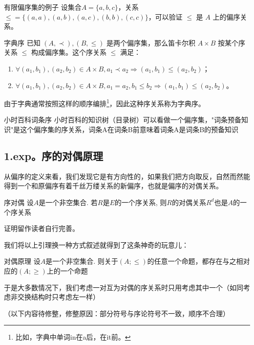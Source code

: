 \begin{example}{有限偏序集的例子}
设集合$A = \{a,b,c\}$，关系$\leq\!= \{(a,a),(a,b),(a,c),(b,b),(c,c)\}$，可以验证 $\leq$ 是 $A$ 上的偏序关系。
\end{example}

\begin{example}{字典序}\label{ex_OrdRel_1}
已知 $(A,\prec),(B,\leq)$ 是两个偏序集，那么笛卡尔积 $A\times B$ 按某个序关系 $\leqslant$ 构成偏序集。这个序关系 $\leqslant$ 满足：
\begin{enumerate}
\item $\forall(a_1,b_1),(a_2,b_2) \in A\times B, a_1\prec a_2 \Rightarrow (a_1,b_1)\leqslant(a_2,b_2)$；
\item $\forall(a_1,b_1),(a_2,b_2) \in A\times B, a_1=a_2, b_1\leq b_2 \Rightarrow (a_1,b_1) \leqslant (a_2, b_2)$。
\end{enumerate}

由于字典通常按照这样的顺序编排\footnote{比如，字典中单词in在a后，在it前。}，因此这种序关系称为字典序。
\end{example}

\begin{example}{小时百科词条序}
小时百科的知识树（目录树）可以看做一个偏序集，"词条预备知识"是这个偏序集的序关系，词条A在词条B前意味着词条A是词条B的预备知识
\end{example}

\subsection{1.exp。序的对偶原理}
从偏序的定义来看，我们发现它是有方向性的，如果我们把方向取反，自然而然能得到一个和原偏序有着千丝万缕关系的新偏序，也就是偏序的对偶关系。

\begin{lemma}{序对偶}
  设$A$是一个非空集合. 若$R$是$E$的一个序关系, 则$R$的对偶关系$R^{d}$也是$A$的一个序关系
\end{lemma}
证明留作读者自行完善。

我们将以上引理换一种方式叙述就得到了这条神奇的玩意儿：
\begin{theorem}{对偶原理}
 设$A$是一个非空集合. 则关于$(A;\leq)$的任意一个命题，都存在与之相对应的$(A;\geq)$上的一个命题
\end{theorem}

于是大多数情况下，我们考虑一对互为对偶的序关系时只用考虑其中一个（如同考虑非交换结构时只考虑左一样）

（以下内容待修整，修整原因：部分符号与序论符号不一致，顺序不合理）
